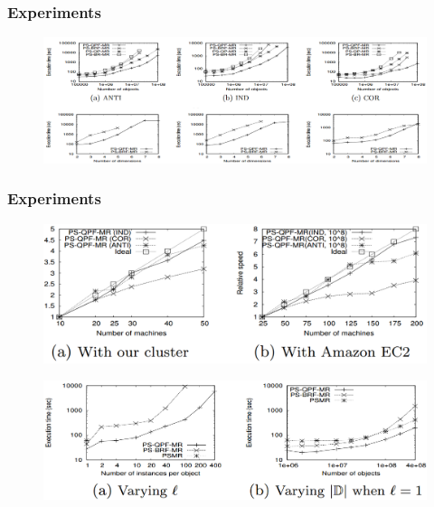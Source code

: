 \documentclass{beamer}
\begin{document}
\begin{frame} %
\frametitle{Experiments}
\begin{figure}[htpb]
  \begin{center}
	\includegraphics[width=\linewidth]{algorithm-comparison.png}
  \end{center}
\end{figure}
\end{frame}


\begin{frame} %
\frametitle{Experiments}
\begin{figure}[htpb]
  \begin{center}
	\includegraphics[width=\linewidth]{cluster-comparison.png}
  \end{center}
\end{figure}

\begin{figure}[htpb]
  \begin{center}
	\includegraphics[width=\linewidth]{algorithm-comparison2.png}
  \end{center}
\end{figure}
\end{frame}
\end{document}
